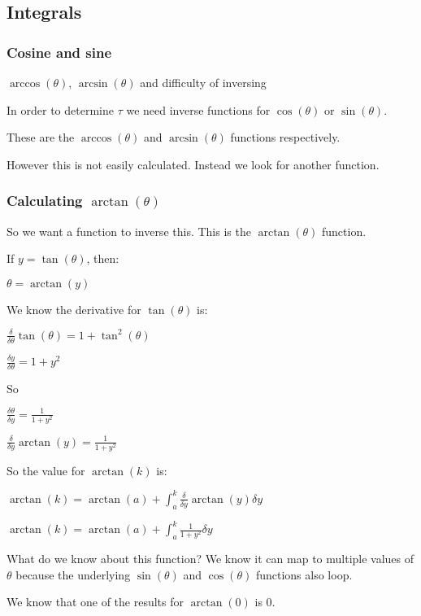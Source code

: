 
\subsection{Integrals}

\subsubsection{Cosine and sine}

\(\arccos (\theta)\), \(\arcsin (\theta )\) and difficulty of inversing

In order to determine \(\tau \) we need inverse functions for \(\cos (\theta )\) or \(\sin (\theta )\).

These are the \(\arccos (\theta )\) and \(\arcsin (\theta )\) functions respectively.

However this is not easily calculated. Instead we look for another function.

\subsubsection{Calculating \(\arctan (\theta )\)}

So we want a function to inverse this. This is the \(\arctan (\theta )\) function.

If \(y=\tan (\theta )\), then:

\(\theta =\arctan (y)\)

We know the derivative for \(\tan (\theta )\) is:

\(\frac{\delta }{\delta \theta }\tan (\theta )=1+\tan^2(\theta )\)

\(\frac{\delta y}{\delta \theta }=1+y^2\)

So

\(\frac{\delta \theta }{\delta y}=\frac{1}{1+y^2}\)

\(\frac{\delta }{\delta y}\arctan (y)=\frac{1}{1+y^2}\)

So the value for \(\arctan (k)\) is:

\(\arctan (k)=\arctan (a)+\int_a^k\frac{\delta }{\delta y}\arctan (y) \delta y\)

\(\arctan (k)=\arctan (a)+\int_a^k\frac{1}{1+y^2} \delta y\)

What do we know about this function? We know it can map to multiple values of \(\theta \) because the underlying \(\sin (\theta )\) and \(\cos (\theta )\) functions also loop.

We know that one of the results for \(\arctan (0)\) is \(0\).

